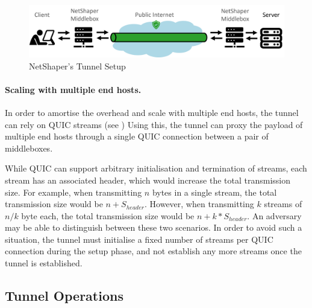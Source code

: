 \begin{figure}[!htb]
    \centering
    \includegraphics[width=\columnwidth]{figures/netshaper/netshaper-setup.png}
    \caption{NetShaper's Tunnel Setup}
    \label{fig:netshaper-setup}
\end{figure}

\paragraph{Scaling with multiple end hosts.}
In order to amortise the overhead and scale with multiple end hosts, the tunnel can rely on QUIC streams (see )
Using this, the tunnel can proxy the payload of multiple end hosts through a single QUIC connection between a pair of middleboxes.

While QUIC can support arbitrary initialisation and termination of streams, each stream has an associated header, which would increase the total transmission size.
For example, when transmitting $n$ bytes in a single stream, the total transmission size would be $n + S_{header}$.
However, when transmitting $k$ streams of $n/k$ byte each, the total transmission size would be $n + k*S_{header}$. 
An adversary may be able to distinguish between these two scenarios.
In order to avoid such a situation, the tunnel must initialise a fixed number of streams per QUIC connection during the setup phase, and not establish any more streams once the tunnel is established.


\subsection{Tunnel Operations}

